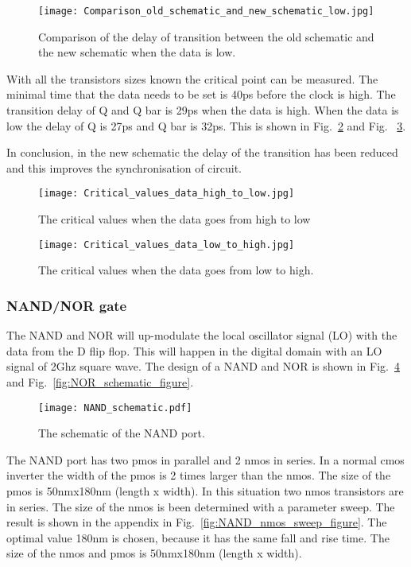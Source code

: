 \begin{figure}[h]
\texttt{[image: Comparison\_old\_schematic\_and\_new\_schematic\_low.jpg]}
\caption{Comparison of the delay of transition between the old schematic and the new schematic when the data is low.}
\label{fig:Comparison_old_schematic_and_new_schematic_low_figure}
\end{figure}

With all the transistors sizes known the critical point can be measured. The minimal time that the data needs to be set is 40ps before the clock is high. The transition delay of Q and Q bar is 29ps when the data is high. When the data is low the delay of Q is 27ps and Q bar is 32ps. This is shown in Fig.~\ref{fig:Critical_values_data_high_to_low_figure} and Fig. ~\ref{fig:Critical_values_data_low_to_high_figure}.

In conclusion, in the new schematic the delay of the transition has been reduced and this improves the synchronisation of circuit.   

\begin{figure}[h]
\texttt{[image: Critical\_values\_data\_high\_to\_low.jpg]}
\caption{The critical values when the data goes from high to low}
\label{fig:Critical_values_data_high_to_low_figure}
\end{figure}

\begin{figure}[h]
\texttt{[image: Critical\_values\_data\_low\_to\_high.jpg]}
\caption{The critical values when the data goes from low to high.}
\label{fig:Critical_values_data_low_to_high_figure}
\end{figure}

\subsubsection{NAND/NOR gate}\label{sec:frontend}
The NAND and NOR will up-modulate the local oscillator signal (LO) with the data from the D flip flop. This will happen in the digital domain with an LO signal of 2Ghz square wave.
The design of a NAND and NOR is shown in Fig.~\ref{fig:NAND_schematic_figure} and Fig.~\ref{fig:NOR_schematic_figure}.

\begin{figure}[htp]
\texttt{[image: NAND\_schematic.pdf]}
\caption{The schematic of the NAND port.}
\label{fig:NAND_schematic_figure}
\end{figure}

The NAND port has two pmos in parallel and 2 nmos in series. In a normal cmos inverter the width of the pmos is 2 times larger than the nmos. The size of the pmos is 50nmx180nm (length x width).  In this situation two nmos transistors are in series. The size of the nmos is been determined with a parameter sweep. The result is shown in the appendix in Fig.~\ref{fig:NAND_nmos_sweep_figure}. The optimal value 180nm is chosen, because it has the same fall and rise time. The size of the nmos and pmos is 50nmx180nm (length x width).

